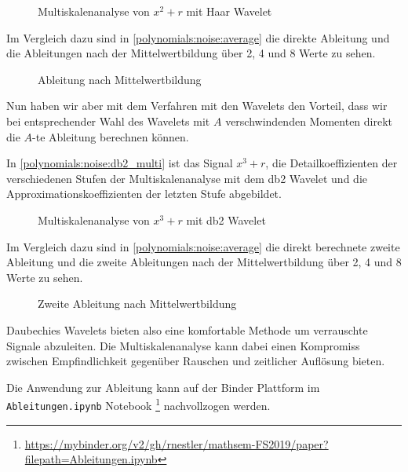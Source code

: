 \begin{refsection}
\begin{figure}
    \centering
    
    \caption{Multiskalenanalyse von $x^2 + r$ mit Haar Wavelet\label{polynomials:noise:db1_multi}}
\end{figure}

Im Vergleich dazu sind in \autoref{polynomials:noise:average} die direkte
Ableitung und die Ableitungen nach der Mittelwertbildung über 2, 4 und 8 Werte
zu sehen.

\begin{figure}
    \centering
    
    \caption{Ableitung nach Mittelwertbildung\label{polynomials:noise:average}}
\end{figure}

Nun haben wir aber mit dem Verfahren mit den Wavelets den Vorteil, dass wir bei
entsprechender Wahl des Wavelets mit $A$ verschwindenden Momenten direkt die
$A$-te Ableitung berechnen können.

In \autoref{polynomials:noise:db2_multi} ist das Signal $x^3 + r$, die
Detailkoeffizienten der verschiedenen Stufen der Multiskalenanalyse mit dem db2
Wavelet und die Approximationskoeffizienten der letzten Stufe abgebildet.

\begin{figure}
    \centering
%    
    \caption{Multiskalenanalyse von $x^3 + r$ mit db2 Wavelet\label{polynomials:noise:db2_multi}}
\end{figure}

Im Vergleich dazu sind in \autoref{polynomials:noise:average} die direkt
berechnete zweite Ableitung und die zweite Ableitungen nach der
Mittelwertbildung über 2, 4 und 8 Werte zu sehen.

\begin{figure}
    \centering
    
    \caption{Zweite Ableitung nach Mittelwertbildung\label{polynomials:noise:average2nd}}
\end{figure}

Daubechies Wavelets bieten also eine komfortable Methode um verrauschte Signale
abzuleiten. Die Multiskalenanalyse kann dabei einen Kompromiss zwischen
Empfindlichkeit gegenüber Rauschen und zeitlicher Auflösung bieten.

Die Anwendung zur Ableitung kann auf der Binder Plattform im
\texttt{Ableitungen.ipynb} Notebook%
\footnote{\url{https://mybinder.org/v2/gh/rnestler/mathsem-FS2019/paper?filepath=Ableitungen.ipynb}}
nachvollzogen werden.


\end{refsection}

